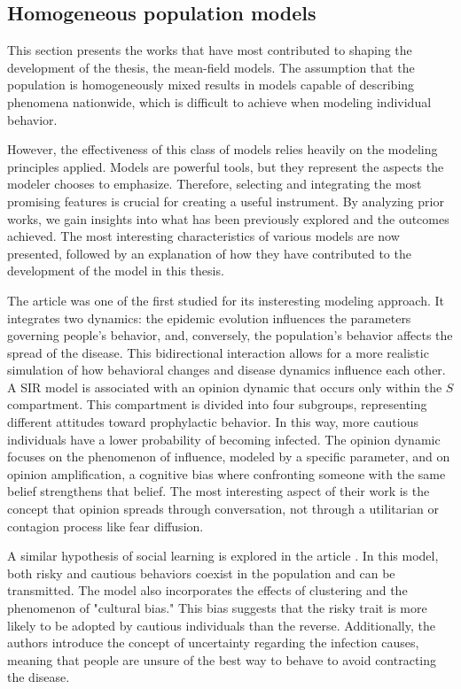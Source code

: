 \subsection{Homogeneous population models}
\label{subsec:homogeneous}
This section presents the works that have most contributed to shaping the development of the thesis, the mean-field models. The assumption that the population is homogeneously mixed results in models capable of describing phenomena nationwide, which is difficult to achieve when modeling individual behavior.

However, the effectiveness of this class of models relies heavily on the modeling principles applied. Models are powerful tools, but they represent the aspects the modeler chooses to emphasize. Therefore, selecting and integrating the most promising features is crucial for creating a useful instrument. By analyzing prior works, we gain insights into what has been previously explored and the outcomes achieved.
The most interesting characteristics of various models are now presented, followed by an explanation of how they have contributed to the development of the model in this thesis.

The article \cite{Tyson_2020} was one of the first studied for its insteresting modeling approach. It integrates two dynamics: the epidemic evolution influences the parameters governing people's behavior, and, conversely, the population's behavior affects the spread of the disease. This bidirectional interaction allows for a more realistic simulation of how behavioral changes and disease dynamics influence each other.
A SIR model is associated with an opinion dynamic that occurs only within the $S$ compartment. This compartment is divided into four subgroups, representing different attitudes toward prophylactic behavior. In this way, more cautious individuals have a lower probability of becoming infected. The opinion dynamic focuses on the phenomenon of influence, modeled by a specific parameter, and on opinion amplification, a cognitive bias where confronting someone with the same belief strengthens that belief.
The most interesting aspect of their work is the concept that opinion spreads through conversation, not through a utilitarian or contagion process like fear diffusion.

A similar hypothesis of social learning is explored in the article \cite{Tanaka_2002}. In this model, both risky and cautious behaviors coexist in the population and can be transmitted. The model also incorporates the effects of clustering and the phenomenon of "cultural bias." This bias suggests that the risky trait is more likely to be adopted by cautious individuals than the reverse. Additionally, the authors introduce the concept of uncertainty regarding the infection causes, meaning that people are unsure of the best way to behave to avoid contracting the disease.


